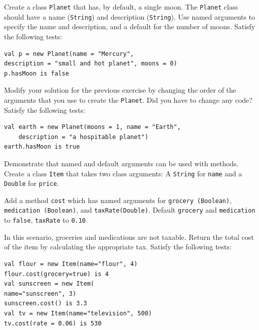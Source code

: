 \documentclass[a4paper,12pt]{exam}
\begin{document}
\begin{questions}
\question
Create a class \texttt{Planet} that has, by default, a single moon. 
The \texttt{Planet} class should have a name (\texttt{String}) and description (\texttt{String}). 
Use named arguments to specify the name and description, and a default for the number of moons. 
Satisfy the following tests:
\begin{Verbatim}
val p = new Planet(name = "Mercury",
description = "small and hot planet", moons = 0)
p.hasMoon is false
\end{Verbatim}

\begin{solution}
\end{solution}

\question
Modify your solution for the previous exercise by changing the order of the arguments 
that you use to create the \texttt{Planet}. Did you have to change any code? 
Satisfy the following tests:
\begin{Verbatim}
val earth = new Planet(moons = 1, name = "Earth",
    description = "a hospitable planet") 
earth.hasMoon is true
\end{Verbatim}

\begin{solution}
\end{solution}

\question
Demonstrate that named and default arguments can be used with methods. 
Create a class \texttt{Item} that takes two class arguments: 
A \texttt{String} for \texttt{name} and a \texttt{Double} for \texttt{price}. 

Add a method \texttt{cost} which has named arguments for \texttt{grocery (Boolean)}, 
\texttt{medication (Boolean)}, and \texttt{taxRate(Double)}. 
Default \texttt{grocery} and \texttt{medication} to \texttt{false}, 
\texttt{taxRate} to \texttt{0.10}. 

In this scenario, groceries and medications are not taxable. 
Return the total cost of the item by calculating the appropriate tax. 
Satisfy the following tests:
\begin{Verbatim}
val flour = new Item(name="flour", 4) 
flour.cost(grocery=true) is 4
val sunscreen = new Item(
name="sunscreen", 3)
sunscreen.cost() is 3.3
val tv = new Item(name="television", 500) 
tv.cost(rate = 0.06) is 530
\end{Verbatim}

\begin{solution}
\end{solution}


\end{questions}
\end{document}
